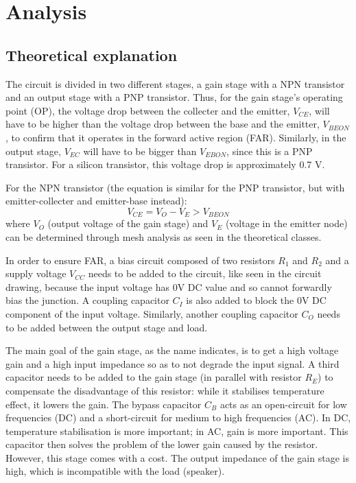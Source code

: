\section{Analysis}
\label{sec:analysis}
\subsection{Theoretical explanation}

The circuit is divided in two different stages, a gain stage with a NPN transistor and an output stage with a PNP transistor. Thus, for the gain stage's operating point (OP), the voltage drop between the collecter and the emitter, $V_{CE}$, will have to be higher than the voltage drop between the base and the emitter, $V_{BEON}$, to confirm that it operates in the forward active region (FAR). Similarly, in the output stage, $V_{EC}$ will have to be bigger than $V_{EBON}$, since this is a PNP transistor. For a silicon transistor, this voltage drop is approximately 0.7 V.

For the NPN transistor (the equation is similar for the PNP transistor, but with emitter-collecter and emitter-base instead):
\begin{equation}
    V_{CE} = V_O - V_E > V_{BEON}
\end{equation}
where $V_O$ (output voltage of the gain stage) and $V_E$ (voltage in the emitter node) can be determined through mesh analysis as seen in the theoretical classes.

In order to ensure FAR, a bias circuit composed of two resistors $R_1$ and $R_2$ and a supply voltage $V_{CC}$ needs to be added to the circuit, like seen in the circuit drawing, because the input voltage has 0V DC value and so cannot forwardly bias the junction. A coupling capacitor $C_I$ is also added to block the 0V DC component of the input voltage. Similarly, another coupling capacitor $C_O$ needs to be added between the output stage and load. 

The main goal of the gain stage, as the name indicates, is to get a high voltage gain and a high input impedance so as to not degrade the input signal.  A third capacitor needs to be added to the gain stage (in parallel with resistor $R_E$) to compensate the disadvantage of this resistor: while it stabilises temperature effect, it lowers the gain. The bypass capacitor $C_B$ acts as an open-circuit for low frequencies (DC) and a short-circuit for medium to high frequencies (AC). In DC, temperature stabilisation is more important; in AC, gain is more important. This capacitor then solves the problem of the lower gain caused by the resistor. However, this stage comes with a cost. The output impedance of the gain stage is high, which is incompatible with the load (speaker).

